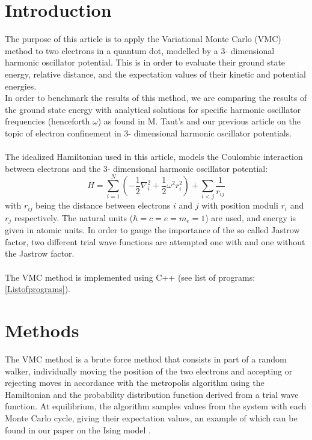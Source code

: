 \documentclass[10pt,a4paper]{article}
\begin{document}
\section{Introduction}
The purpose of this article is to apply the Variational Monte Carlo (VMC) method to two electrons in a quantum dot, modelled by a 3- dimensional harmonic oscillator potential. This is in order to evaluate their ground state energy, relative distance, and the expectation values of their kinetic and potential energies.\\In order to benchmark the results of this method, we are comparing the results of the ground state energy with analytical solutions for specific harmonic oscillator frequencies (henceforth $\omega$) as found in M. Taut's \cite{PhysRevA.48.3561} and our previous article \cite{Project2} on the topic of electron confinement in 3- dimensional harmonic oscillator potentials.\\\\The idealized Hamiltonian used in this article, models the Coulombic interaction between electrons and the 3- dimensional harmonic oscillator potential: 
\begin{equation}
  \label{eq:finalH}
  \hat{H}=\sum_{i=1}^{N} \left(  -\frac{1}{2} \nabla_i^2 + \frac{1}{2} \omega^2r_i^2  \right)+\sum_{i<j}\frac{1}{r_{ij}}
\end{equation}
\cite{Problem_set_5} with $r_{ij}$ being the distance between electrons $i$ and $j$ with position moduli $r_i$ and $r_j$ respectively. The natural units ($\hbar = c = e = m_e =1$) are used, and energy is given in atomic units. In order to gauge the importance of the so called Jastrow factor, two different trial wave functions are attempted one with and one without the Jastrow factor.\\\\The VMC method is implemented using C++ (see list of programs: \ref{Listofprograms}).
\section{Methods}
The VMC method is a brute force method that consists in part of a random walker, individually moving the position of the two electrons and accepting or rejecting moves in accordance with the metropolis algorithm using the Hamiltonian and the probability distribution function derived from a trial wave function. At equilibrium, the algorithm samples values from the system with each Monte Carlo cycle, giving their expectation values, an example of which can be found in our paper on the Ising model \cite{Project4}.
\end{document}
